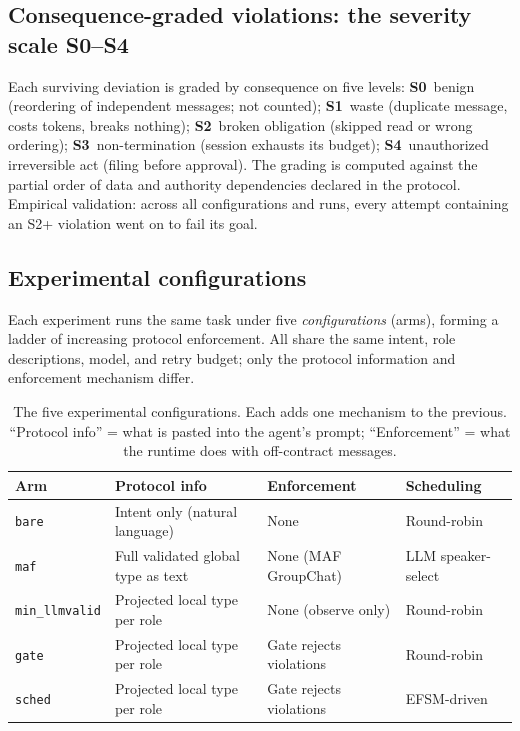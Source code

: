 \subsection{Consequence-graded violations: the severity scale S0--S4}\label{sec:severity}

Each surviving deviation is graded by consequence on five levels:
\textbf{S0}~benign (reordering of independent messages; not counted);
\textbf{S1}~waste (duplicate message, costs tokens, breaks nothing);
\textbf{S2}~broken obligation (skipped read or wrong ordering);
\textbf{S3}~non-termination (session exhausts its budget);
\textbf{S4}~unauthorized irreversible act (filing before approval).
The grading is computed against the partial order of data and authority
dependencies declared in the protocol.
Empirical validation: across all configurations and runs, every attempt
containing an S2+ violation went on to fail its goal.

\subsection{Experimental configurations}\label{sec:configs}

Each experiment runs the same task under five \emph{configurations}
(arms), forming a ladder of increasing protocol enforcement.
All share the same intent, role descriptions, model, and retry budget;
only the protocol information and enforcement mechanism differ.

\begin{table}[h]
\centering\small
\caption{The five experimental configurations. Each adds one mechanism
to the previous. ``Protocol info'' = what is pasted into the agent's prompt;
``Enforcement'' = what the runtime does with off-contract messages.}
\label{tab:configs}
\begin{tabular}{@{}llll@{}}
\toprule
\textbf{Arm} & \textbf{Protocol info} & \textbf{Enforcement} & \textbf{Scheduling} \\
\midrule
\texttt{bare} & Intent only (natural language) & None & Round-robin \\
\texttt{maf} & Full validated global type as text & None (MAF GroupChat) & LLM speaker-select \\
\texttt{min\_llmvalid} & Projected local type per role & None (observe only) & Round-robin \\
\texttt{gate} & Projected local type per role & Gate rejects violations & Round-robin \\
\texttt{sched} & Projected local type per role & Gate rejects violations & EFSM-driven \\
\bottomrule
\end{tabular}
\end{table}

